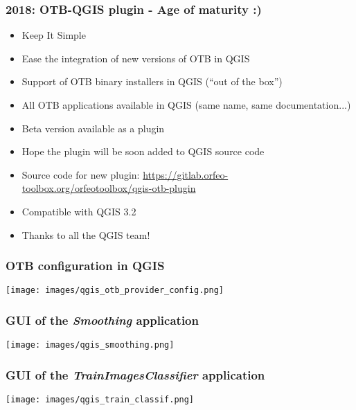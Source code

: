 \begin{frame}
  \frametitle{2018: OTB-QGIS plugin - Age of maturity :)}
  \begin{itemize}
  \item Keep It Simple
  \item Ease the integration of new versions of OTB in QGIS
  \item Support of OTB binary installers in QGIS (``out of the box'')
  \item All OTB applications available in QGIS (same name, same documentation...)  
  \item \alert{Beta version} available as a plugin
  \item Hope the plugin will be soon added to QGIS source code
  \item
    Source code for new plugin: \url{https://gitlab.orfeo-toolbox.org/orfeotoolbox/qgis-otb-plugin}
  \item Compatible with QGIS 3.2
  \item Thanks to all the QGIS team!
  \end{itemize}
\end{frame}

\begin{frame}
\frametitle{OTB configuration in QGIS}
\begin{center}
\texttt{[image: images/qgis\_otb\_provider\_config.png]}
\end{center} 
\end{frame}

\begin{frame}
\frametitle{GUI of the \textit{Smoothing} application}
\begin{center}
\texttt{[image: images/qgis\_smoothing.png]}
\end{center} 
\end{frame}

\begin{frame}
\frametitle{GUI of the \textit{TrainImagesClassifier} application}
\begin{center}
\texttt{[image: images/qgis\_train\_classif.png]}
\end{center} 
\end{frame}
